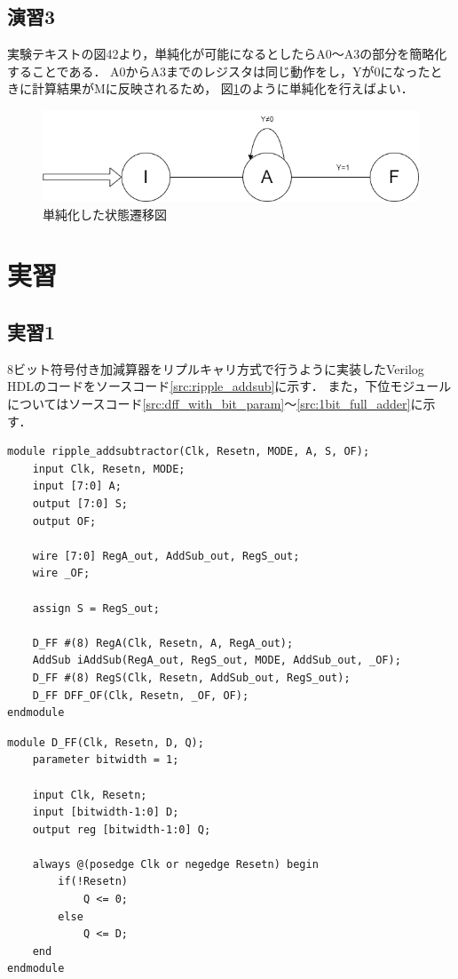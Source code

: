 \documentclass{jlreq}
\numberwithin{equation}{section}
\begin{document}
\subsection{演習3}
実験テキストの図42より，単純化が可能になるとしたらA0～A3の部分を簡略化することである．
A0からA3までのレジスタは同じ動作をし，Yが0になったときに計算結果がMに反映されるため，
図\ref{enshu4}のように単純化を行えばよい．
\begin{figure}[H]
  \centering
  \includegraphics[width=\textwidth]{assets/enshu4.png}
  \caption{単純化した状態遷移図}
  \label{enshu4}
\end{figure}

\section{実習}
\subsection{実習1}
8ビット符号付き加減算器をリプルキャリ方式で行うように実装したVerilog HDLのコードをソースコード\ref{src:ripple_addsub}に示す．
また，下位モジュールについてはソースコード\ref{src:dff_with_bit_param}～\ref{src:1bit_full_adder}に示す．
\begin{lstlisting}[caption={8ビット符号付き加減算器の上位モジュール}, label={src:ripple_addsub}]
module ripple_addsubtractor(Clk, Resetn, MODE, A, S, OF);
	input Clk, Resetn, MODE;
	input [7:0] A;
	output [7:0] S;
	output OF;
	
	wire [7:0] RegA_out, AddSub_out, RegS_out;
	wire _OF;
	
	assign S = RegS_out;
	
	D_FF #(8) RegA(Clk, Resetn, A, RegA_out);
	AddSub iAddSub(RegA_out, RegS_out, MODE, AddSub_out, _OF);
	D_FF #(8) RegS(Clk, Resetn, AddSub_out, RegS_out);
	D_FF DFF_OF(Clk, Resetn, _OF, OF);
endmodule
\end{lstlisting}

\begin{lstlisting}[caption={ビット幅をパラメータに持つDFFモジュール}, label={src:dff_with_bit_param}]
module D_FF(Clk, Resetn, D, Q);
	parameter bitwidth = 1;
	
	input Clk, Resetn;
	input [bitwidth-1:0] D;
	output reg [bitwidth-1:0] Q;
	
	always @(posedge Clk or negedge Resetn) begin
		if(!Resetn)
			Q <= 0;
		else
			Q <= D;
	end
endmodule
\end{lstlisting}
\end{document}
